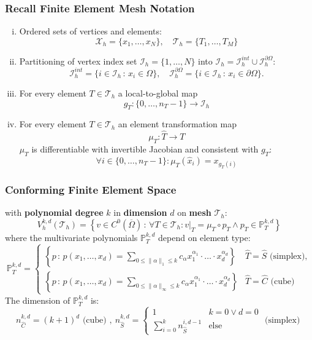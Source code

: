 \documentclass[aspectratio=169,11pt]{beamer}
\theoremstyle{definition}
\begin{document}
\begin{frame}
\frametitle{Recall Finite Element Mesh Notation}
\begin{enumerate}[i)]
\item Ordered sets of vertices and elements:
$$\mathcal{X}_h = \{x_1,\ldots,x_N\}, \quad\mathcal{T}_h = \{T_1, \ldots, T_M\}$$
\item Partitioning of vertex index set $\mathcal{I}_h=\{1,\ldots,N\}$ into $
\mathcal{I}_h = \mathcal{I}_h^{int}\cup\mathcal{I}_h^{\partial\Omega}$:
\begin{equation*}
\mathcal{I}_h^{int} = \{i\in \mathcal{I}_h\,:\, x_i\in\Omega\},
\quad \mathcal{I}_h^{\partial\Omega} = \{i\in \mathcal{I}_h\,:\, x_i\in\partial\Omega\}.
\end{equation*}
\item For every element $T\in\mathcal{T}_h$ a local-to-global map
$$g_T:\{0,\ldots,n_T-1\}\to\mathcal{I}_h$$
\item For every element $T\in\mathcal{T}_h$ an element transformation map
$$\mu_T : \hat T \to T$$
$\mu_T$ is differentiable with invertible Jacobian and consistent with $g_T$:
$$\forall i\in\{0,\ldots,n_T-1\} : \mu_T(\hat x_i) = x_{g_T(i)}$$
\end{enumerate}
\end{frame}

\begin{frame}
\frametitle{Conforming Finite Element Space}
with \textbf{polynomial degree} $k$ in \textbf{dimension} $d$ on \textbf{mesh} $\mathcal{T}_h$:
\begin{equation*}
V_h^{k,d}(\mathcal{T}_h) = \left\{ v\in C^0(\overline{\Omega}) \,:\,
\forall T\in\mathcal{T}_h : v|_T = \mu_T \circ p_T \wedge p_T\in\mathbb{P}_T^{k,d}\right\}
\end{equation*}
where the multivariate polynomials $\mathbb{P}_T^{k,d}$ depend on element type:
{\small\begin{equation*}
\mathbb{P}_T^{k,d} = \left\{\begin{array}{ll}
\left\{ p\,:\, p(x_1,\ldots,x_d) = \sum\limits_{0\leq\|\alpha\|_1\leq k} c_\alpha
x_1^{\alpha_1}\cdot\ldots\cdot x_d^{\alpha_d}\right\} & \text{$\hat T = \hat S$ (simplex)}, \\
\left\{ p\,:\, p(x_1,\ldots,x_d) = \sum\limits_{0\leq\|\alpha\|_\infty\leq k} c_\alpha
x_1^{\alpha_1}\cdot\ldots\cdot x_d^{\alpha_d}\right\} & \text{$\hat T = \hat C$ (cube)}
\end{array}\right .
\end{equation*}}
The dimension of $\mathbb{P}^{k,d}_T$ is:
\begin{equation*}
n_{\hat C}^{k,d} = (k+1)^d \text{ (cube) },  \
n_{\hat S}^{k,d} = \left\{ \begin{array}{ll}
1 & k=0 \vee d=0\\
\sum\limits_{i=0}^k n_{\hat S}^{i,d-1} &\text{else}
\end{array}\right . \text{ (simplex) }
\end{equation*}
\end{frame}
\end{document}
